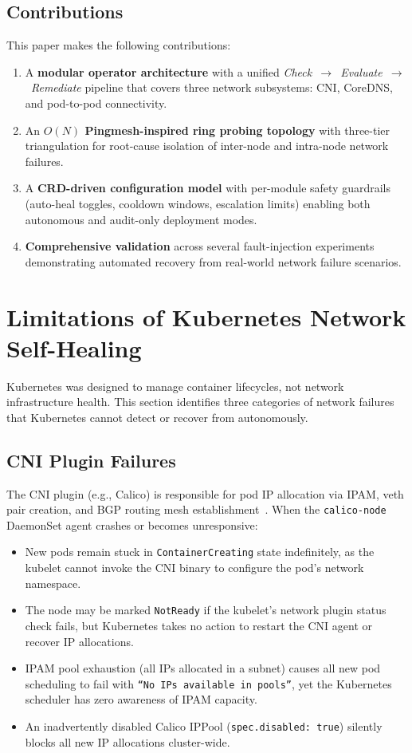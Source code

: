 \documentclass[conference]{IEEEtran}
\begin{document}
\subsection{Contributions}

This paper makes the following contributions:
\begin{enumerate}
  \item A \textbf{modular operator architecture} with a unified \emph{Check~$\to$~Evaluate~$\to$~Remediate} pipeline that covers three network subsystems: CNI, CoreDNS, and pod-to-pod connectivity.
  \item An \textbf{$O(N)$ Pingmesh-inspired ring probing topology} with three-tier triangulation for root-cause isolation of inter-node and intra-node network failures.
  \item A \textbf{CRD-driven configuration model} with per-module safety guardrails (auto-heal toggles, cooldown windows, escalation limits) enabling both autonomous and audit-only deployment modes.
  \item \textbf{Comprehensive validation} across several fault-injection experiments demonstrating automated recovery from real-world network failure scenarios.
\end{enumerate}

\section{Limitations of Kubernetes Network Self-Healing}

Kubernetes was designed to manage container lifecycles, not network infrastructure health. This section identifies three categories of network failures that Kubernetes cannot detect or recover from autonomously.

\subsection{CNI Plugin Failures}
The CNI plugin (e.g., Calico) is responsible for pod IP allocation via IPAM, veth pair creation, and BGP routing mesh establishment~\cite{calico-docs, cni-spec}. When the \texttt{calico-node} DaemonSet agent crashes or becomes unresponsive:
\begin{itemize}
  \item New pods remain stuck in \texttt{ContainerCreating} state indefinitely, as the kubelet cannot invoke the CNI binary to configure the pod's network namespace.
  \item The node may be marked \texttt{NotReady} if the kubelet's network plugin status check fails, but Kubernetes takes no action to restart the CNI agent or recover IP allocations.
  \item IPAM pool exhaustion (all IPs allocated in a subnet) causes all new pod scheduling to fail with \texttt{``No IPs available in pools''}, yet the Kubernetes scheduler has zero awareness of IPAM capacity.
  \item An inadvertently disabled Calico IPPool (\texttt{spec.disabled:~true}) silently blocks all new IP allocations cluster-wide.
\end{itemize}
\end{document}
